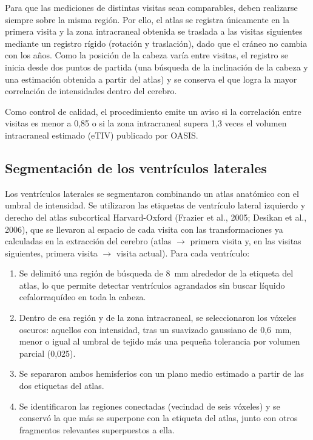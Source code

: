 \documentclass[10pt]{article}
\begin{document}
Para que las mediciones de distintas visitas sean comparables, deben realizarse siempre sobre la misma región. Por ello, el atlas se registra únicamente en la primera visita y la zona intracraneal obtenida se traslada a las visitas siguientes mediante un registro rígido (rotación y traslación), dado que el cráneo no cambia con los años. Como la posición de la cabeza varía entre visitas, el registro se inicia desde dos puntos de partida (una búsqueda de la inclinación de la cabeza y una estimación obtenida a partir del atlas) y se conserva el que logra la mayor correlación de intensidades dentro del cerebro.
 
Como control de calidad, el procedimiento emite un aviso si la correlación entre visitas es menor a 0,85 o si la zona intracraneal supera 1,3 veces el volumen intracraneal estimado (eTIV) publicado por OASIS.

\subsection{Segmentación de los ventrículos laterales}
 
Los ventrículos laterales se segmentaron combinando un atlas anatómico con el umbral de intensidad. Se utilizaron las etiquetas de ventrículo lateral izquierdo y derecho del atlas subcortical Harvard-Oxford (Frazier et al., 2005; Desikan et al., 2006), que se llevaron al espacio de cada visita con las transformaciones ya calculadas en la extracción del cerebro (atlas $\rightarrow$ primera visita y, en las visitas siguientes, primera visita $\rightarrow$ visita actual). Para cada ventrículo:
 
\begin{enumerate}
    \item Se delimitó una región de búsqueda de 8~mm alrededor de la etiqueta del atlas, lo que permite detectar ventrículos agrandados sin buscar líquido cefalorraquídeo en toda la cabeza.
    \item Dentro de esa región y de la zona intracraneal, se seleccionaron los vóxeles oscuros: aquellos con intensidad, tras un suavizado gaussiano de 0,6~mm, menor o igual al umbral de tejido más una pequeña tolerancia por volumen parcial (0,025).
    \item Se separaron ambos hemisferios con un plano medio estimado a partir de las dos etiquetas del atlas.
    \item Se identificaron las regiones conectadas (vecindad de seis vóxeles) y se conservó la que más se superpone con la etiqueta del atlas, junto con otros fragmentos relevantes superpuestos a ella.
\end{enumerate}
 
\end{document}
